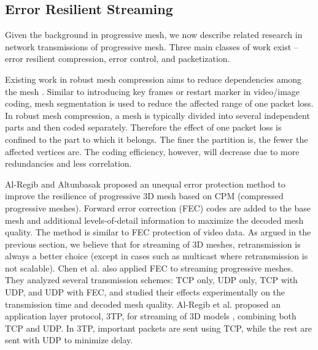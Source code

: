 \documentclass[11pt, a4paper]{report}
\begin{document}
    \subsection{Error Resilient Streaming}
    Given the background in progressive mesh, we now describe
    related research in network transmissions of progressive mesh. 
    Three main classes of work exist 
    -- error resilient compression, error control, and
    packetization.

    Existing work in robust mesh compression aims to
    reduce dependencies among the mesh \cite{error:Park,error:Yan}.
    Similar to introducing key frames or restart marker in video/image
    coding, mesh
    segmentation is used to reduce the affected range of one
    packet loss. In robust mesh compression, a mesh is typically
    divided into several independent parts and then coded separately.
    Therefore the effect of one packet loss is confined to the part to which
    it belongs. The finer the partition is, the fewer the affected vertices
    are.  The coding efficiency, however, will decrease
    due to more redundancies and less correlation.

    Al-Regib and Altunbasak \cite{unequal:Al-Regib} proposed an
    unequal error protection method to improve the resilience of
    progressive 3D mesh based on CPM (compressed progressive meshes). Forward error
    correction (FEC) codes are added to the
    base mesh and additional levels-of-detail information to maximize 
    the decoded mesh quality.  The method is similar to FEC protection 
    of video data.
    As argued in the previous section, we believe that for streaming
    of 3D meshes, retransmission is always a better choice (except in
    cases such as multicast where retransmission is not scalable).
    Chen et al. \cite{chen05hybrid} also applied FEC to streaming
    progressive meshes. They analyzed several transmission schemes:
    TCP only, UDP only, TCP with UDP, and UDP with FEC, and studied
    their effects experimentally on the transmission time and decoded
    mesh quality.
    Al-Regib et al. proposed an application layer protocol, 3TP,
    for streaming of 3D models \cite{3tpregib}, combining both TCP 
    and UDP.  In 3TP, important packets are sent using
    TCP, while the rest are sent with UDP to minimize delay.
    
\end{document}
